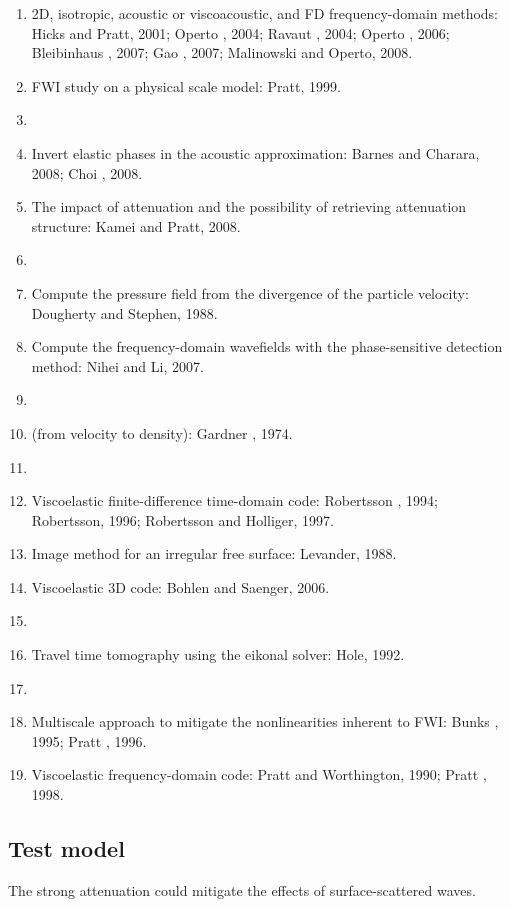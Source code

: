 \begin{enumerate}[\hspace{10mm}*]
  \item 2D, isotropic, acoustic or viscoacoustic, and FD frequency-domain
    methods: Hicks and Pratt, 2001; Operto \etal, 2004; Ravaut \etal, 2004;
    Operto \etal, 2006; Bleibinhaus \etal, 2007; Gao \etal, 2007;
    Malinowski and Operto, 2008.
  \item FWI study on a physical scale model: Pratt, 1999.
  \item \sline
  \item Invert elastic phases in the acoustic approximation:
    Barnes and Charara, 2008; Choi \etal, 2008.
  \item The impact of attenuation and the possibility of
    retrieving attenuation structure: Kamei and Pratt, 2008.
  \item \sline
  \item Compute the pressure field from the divergence of
    the particle velocity: Dougherty and Stephen, 1988.
  \item Compute the frequency-domain wavefields with
    the phase-sensitive detection method: Nihei and Li, 2007.
  \item \sline
  \item {} (from velocity to density):
    Gardner \etal, 1974.
  \item \sline
  \item Viscoelastic finite-difference time-domain code:
    Robertsson \etal, 1994; Robertsson, 1996; Robertsson and Holliger, 1997.
  \item Image method for an irregular free surface: Levander, 1988.
  \item Viscoelastic 3D code: Bohlen and Saenger, 2006.
  \item \sline
  \item Travel time tomography using the eikonal solver: Hole, 1992.
  \item \sline
  \item Multiscale approach to mitigate the nonlinearities inherent to FWI:
    Bunks \etal, 1995; Pratt \etal, 1996.
  \item Viscoelastic frequency-domain code:
    Pratt and Worthington, 1990; Pratt \etal, 1998.
\end{enumerate}

\subsection{Test model}
The strong attenuation could mitigate the effects of surface-scattered waves.

